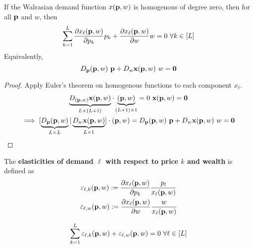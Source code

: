 \documentclass{article}
\begin{document}
 			\begin{proposition}
 				If the Walrasian demand function $x(\textbf{p}, w)$ is homogenous of degree zero, then for all $\textbf{p}$ and $w$, then
 				\begin{equation}
 					\sum_{k=1}^L \frac{\partial{x_\ell(\textbf{p}, w)}}{\partial{p_k}} p_k + \frac{\partial{x_\ell(\textbf{p}, w)}}{\partial{w}} w = 0\ \forall k \in [L]
 				\end{equation}
 				Equivalently,
 				\begin{equation}
 					D_{\textbf{p}} (\textbf{p}, w)\ \textbf{p} + D_w \textbf{x}(\textbf{p}, w)\ w = \textbf{0}
 				\end{equation}
 				\begin{proof}
 					Apply Euler's theorem on homogenous functions to each component $x_\ell$.
 					\begin{gather}
 						\underbrace{D_{(\textbf{p}, w)} \textbf{x}(\textbf{p}, w)}_{L \times (L+1)} \cdot \underbrace{(\textbf{p}, w)}_{(L+1) \times 1} = 0\ \textbf{x}(\textbf{p}, w) = \textbf{0} \\
 						\implies [\underbrace{D_{\textbf{p}} (\textbf{p}, w)}_{L \times L} | \underbrace{D_w \textbf{x}(\textbf{p}, w)}_{L \times 1}] \cdot (\textbf{p}, w) = D_{\textbf{p}} (\textbf{p}, w)\ \textbf{p} + D_w \textbf{x}(\textbf{p}, w)\ w = \textbf{0}
 					\end{gather}
 				\end{proof}
 			\end{proposition}
 			
 			\begin{definition}
 				The \textbf{elasticities of demand $\ell$ with respect to price $k$ and wealth} is defined as 
 				\begin{gather}
 					\varepsilon_{\ell, k} (\textbf{p}, w) := \frac{\partial{x_\ell (\textbf{p}, w)}}{\partial{p_k}} \frac{p_l}{x_\ell (\textbf{p}, w)}\\
 					\varepsilon_{\ell, w} (\textbf{p}, w) := \frac{\partial{x_\ell (\textbf{p}, w)}}{\partial{w}} \frac{w}{x_\ell (\textbf{p}, w)}
 				\end{gather}
 			\end{definition}
 			
  			\begin{corollary}
 				\begin{equation}
 					\sum_{k=1}^L \varepsilon_{\ell, k}(\textbf{p}, w) + \varepsilon_{\ell, w}(\textbf{p}, w) = 0\ \forall \ell \in [L]
 				\end{equation}
 			\end{corollary}
 			
\end{document}
